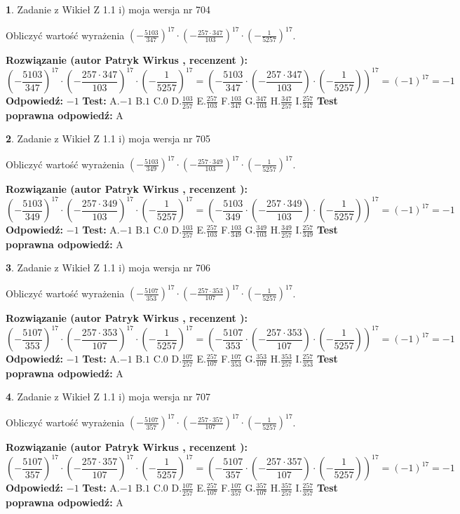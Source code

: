 \documentclass[12pt, a4paper]{article}
\theoremstyle{definition} %
\newtheorem{zad}{}
\newcommand{\zadStart}[1]{\begin{zad}#1\newline}
\newcommand{\zadStop}{\end{zad}}
\newcommand{\rozwStart}[2]{\noindent \textbf{Rozwiązanie (autor #1 , recenzent #2): }\newline}
\newcommand{\rozwStop}{\newline}
\newcommand{\odpStart}{\noindent \textbf{Odpowiedź:}\newline}
\newcommand{\odpStop}{\newline}
\newcommand{\testStart}{\noindent \textbf{Test:}\newline}
\newcommand{\testStop}{\newline}
\newcommand{\kluczStart}{\noindent \textbf{Test poprawna odpowiedź:}\newline}
\newcommand{\kluczStop}{\newline}
\begin{document}
\zadStart{Zadanie z Wikieł Z 1.1 i) moja wersja nr 704}

Obliczyć wartość wyrażenia $(-\frac{5103}{347})^{17} \cdot (-\frac{257 \cdot 347}{103})^{17} \cdot (-\frac{1}{5257})^{17}$.
\zadStop
\rozwStart{Patryk Wirkus}{}
$$(-\frac{5103}{347})^{17} \cdot (-\frac{257 \cdot 347}{103})^{17} \cdot (-\frac{1}{5257})^{17} = (-\frac{5103}{347} \cdot (-\frac{257 \cdot 347}{103}) \cdot (-\frac{1}{5257}))^{17} = (-1)^{17} = -1$$
\rozwStop
\odpStart
$-1$
\odpStop
\testStart
A.$-1$ B.$1$ C.$0$ D.$\frac{103}{257}$ E.$\frac{257}{103}$
F.$\frac{103}{347}$ G.$\frac{347}{103}$
H.$\frac{347}{257}$
I.$\frac{257}{347}$
\testStop
\kluczStart
A
\kluczStop



\zadStart{Zadanie z Wikieł Z 1.1 i) moja wersja nr 705}

Obliczyć wartość wyrażenia $(-\frac{5103}{349})^{17} \cdot (-\frac{257 \cdot 349}{103})^{17} \cdot (-\frac{1}{5257})^{17}$.
\zadStop
\rozwStart{Patryk Wirkus}{}
$$(-\frac{5103}{349})^{17} \cdot (-\frac{257 \cdot 349}{103})^{17} \cdot (-\frac{1}{5257})^{17} = (-\frac{5103}{349} \cdot (-\frac{257 \cdot 349}{103}) \cdot (-\frac{1}{5257}))^{17} = (-1)^{17} = -1$$
\rozwStop
\odpStart
$-1$
\odpStop
\testStart
A.$-1$ B.$1$ C.$0$ D.$\frac{103}{257}$ E.$\frac{257}{103}$
F.$\frac{103}{349}$ G.$\frac{349}{103}$
H.$\frac{349}{257}$
I.$\frac{257}{349}$
\testStop
\kluczStart
A
\kluczStop



\zadStart{Zadanie z Wikieł Z 1.1 i) moja wersja nr 706}

Obliczyć wartość wyrażenia $(-\frac{5107}{353})^{17} \cdot (-\frac{257 \cdot 353}{107})^{17} \cdot (-\frac{1}{5257})^{17}$.
\zadStop
\rozwStart{Patryk Wirkus}{}
$$(-\frac{5107}{353})^{17} \cdot (-\frac{257 \cdot 353}{107})^{17} \cdot (-\frac{1}{5257})^{17} = (-\frac{5107}{353} \cdot (-\frac{257 \cdot 353}{107}) \cdot (-\frac{1}{5257}))^{17} = (-1)^{17} = -1$$
\rozwStop
\odpStart
$-1$
\odpStop
\testStart
A.$-1$ B.$1$ C.$0$ D.$\frac{107}{257}$ E.$\frac{257}{107}$
F.$\frac{107}{353}$ G.$\frac{353}{107}$
H.$\frac{353}{257}$
I.$\frac{257}{353}$
\testStop
\kluczStart
A
\kluczStop



\zadStart{Zadanie z Wikieł Z 1.1 i) moja wersja nr 707}

Obliczyć wartość wyrażenia $(-\frac{5107}{357})^{17} \cdot (-\frac{257 \cdot 357}{107})^{17} \cdot (-\frac{1}{5257})^{17}$.
\zadStop
\rozwStart{Patryk Wirkus}{}
$$(-\frac{5107}{357})^{17} \cdot (-\frac{257 \cdot 357}{107})^{17} \cdot (-\frac{1}{5257})^{17} = (-\frac{5107}{357} \cdot (-\frac{257 \cdot 357}{107}) \cdot (-\frac{1}{5257}))^{17} = (-1)^{17} = -1$$
\rozwStop
\odpStart
$-1$
\odpStop
\testStart
A.$-1$ B.$1$ C.$0$ D.$\frac{107}{257}$ E.$\frac{257}{107}$
F.$\frac{107}{357}$ G.$\frac{357}{107}$
H.$\frac{357}{257}$
I.$\frac{257}{357}$
\testStop
\kluczStart
A
\kluczStop
\end{document}
